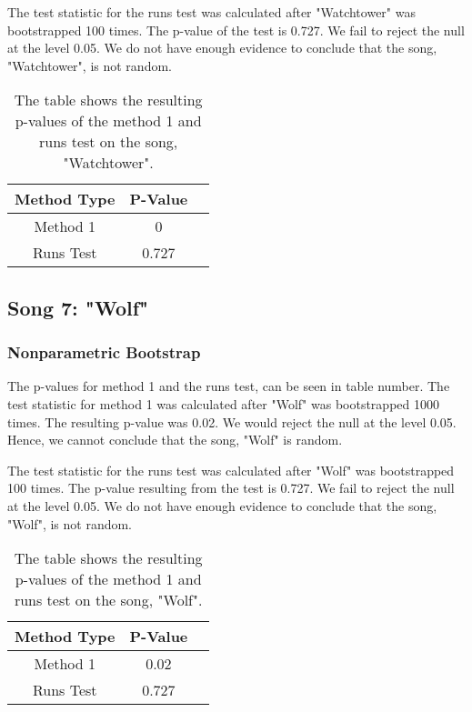 \documentclass[12pt, letterpaper]{article}
\begin{document}
The test statistic for the runs test was calculated after "Watchtower" was bootstrapped 100 times. The p-value of the test is 0.727. We fail to reject the null at the level 0.05. We do not have enough evidence to conclude that the song, "Watchtower", is not random.
\begin{table}[h]
\begin{center}
\begin{tabular}{|c|c|c|}
\hline
\textbf{Method Type} & P-Value \\
\hline
Method 1 & 0  \\
\hline
Runs Test & 0.727 \\ 
\hline
\end{tabular}
\end{center}
\caption{The table shows the resulting p-values of the method 1 and runs test on the song, "Watchtower".}
\label{fig: P-values for "Watchtower"}
\end{table}

\subsection{Song 7: "Wolf"}

\subsubsection{Nonparametric Bootstrap}
The p-values for method 1 and the runs test, can be seen in table number. The test statistic for method 1 was calculated after "Wolf" was bootstrapped 1000 times. The resulting p-value was 0.02. We would reject the null at the level 0.05. Hence, we cannot conclude that the song, "Wolf" is random. 

The test statistic for the runs test was calculated after "Wolf" was bootstrapped 100 times. The p-value resulting from the test is 0.727. We fail to reject the null at the level 0.05. We do not have enough evidence to conclude that the song, "Wolf", is not random.
\begin{table}[h]
\begin{center}
\begin{tabular}{|c|c|c|}
\hline
\textbf{Method Type} & P-Value \\
\hline
Method 1 & 0.02  \\
\hline
Runs Test & 0.727 \\ 
\hline
\end{tabular}
\end{center}
\caption{The table shows the resulting p-values of the method 1 and runs test on the song, "Wolf".}
\label{fig: P-values for "Wolf"}
\end{table}
\end{document}
